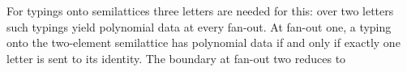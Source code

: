 
For typings onto
semilattices three letters are needed for this: over two letters such typings
yield polynomial data at every fan-out.  At fan-out one, a typing onto the
two-element semilattice has polynomial data if and only if exactly one letter is
sent to its identity.  The boundary at fan-out two reduces to

